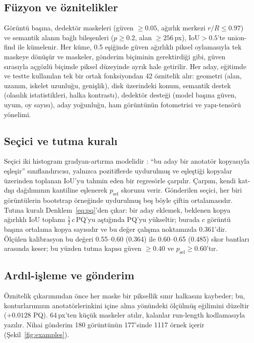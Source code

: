 \documentclass[sigconf]{acmart}
\begin{document}
\subsection{Füzyon ve öznitelikler}
Görüntü başına, dedektör maskeleri (güven $\geq 0.05$, ağırlık merkezi $r/R\leq 0.97$) ve semantik alanın bağlı bileşenleri ($p\geq 0.2$, alan $\geq 256$\,px), $\mathrm{IoU}>0.5$'te union-find ile kümelenir. Her küme, 0.5 eşiğinde güven ağırlıklı piksel oylamasıyla tek maskeye dönüşür ve maskeler, gönderim biçiminin gerektirdiği gibi, güven sırasıyla açgözlü biçimde piksel düzeyinde ayrık hale getirilir. Her aday, eğitimde ve testte kullanılan tek bir ortak fonksiyondan 42 öznitelik alır: geometri (alan, uzanım, iskelet uzunluğu, genişlik), disk üzerindeki konum, semantik destek (olasılık istatistikleri, halka kontrastı), dedektör desteği (model başına güven, uyum, oy sayısı), aday yoğunluğu, ham görüntünün fotometrisi ve yapı-tensörü yönelimi.

\subsection{Seçici ve tutma kuralı}\label{sec:selector}
Seçici iki histogram gradyan-artırma modelidir \cite{pedregosa2011sklearn}: ``bu aday bir anotatör kopyasıyla eşleşir'' sınıflandırıcısı, yalnızca pozitiflerde uydurulmuş ve eşleştiği kopyalar üzerinden toplanan IoU'yu tahmin eden bir regresörle çarpılır. Çarpım, kendi kat-dışı dağılımının kantiline eşlenerek $p_\mathrm{sel}$ skorunu verir. Gönderilen seçici, her biri görüntülerin bootstrap örneğinde uydurulmuş beş böyle çiftin ortalamasıdır. Tutma kuralı Denklem~\ref{eq:pq}'den çıkar: bir aday eklemek, beklenen kopya ağırlıklı IoU toplamı $\tfrac12\,c\,\mathrm{PQ}$'yu aştığında PQ'yu yükseltir; burada $c$ görüntü başına ortalama kopya sayısıdır ve bu değer çalışma noktamızda 0.361'dir. Ölçülen kalibrasyon bu değeri 0.55--0.60 (0.364) ile 0.60--0.65 (0.485) skor bantları arasında keser; bu yüzden tutma kapısı güven $\geq 0.40$ ve $p_\mathrm{sel}\geq 0.60$'tır.

\subsection{Ardıl-işleme ve gönderim}
Öznitelik çıkarımından önce her maske bir piksellik sınır halkasını kaybeder; bu, konturlarımızın anotatörlerinkini içine alma yönündeki ölçülmüş eğilimini düzeltir ($+0.0128$ PQ). 64\,px'ten küçük maskeler atılır, kalanlar run-length kodlamasıyla yazılır. Nihai gönderim 180 görüntünün 177'sinde 1117 örnek içerir (Şekil~\ref{fig:examples}).
\end{document}
